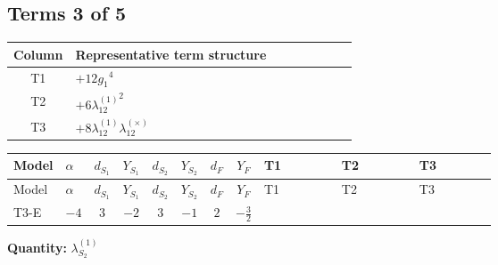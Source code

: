 \documentclass[8pt]{article}
\begin{document}
\begin{landscape}
\subsection*{Terms 3 of 5}
\begin{center}
\begin{tabular}{@{}c >{\raggedright\arraybackslash}p{0.82\linewidth}@{}}
\toprule
Column & Representative term structure \\
\midrule
T1 & \(\displaystyle +12 {g_1}^4\) \\
\midrule
T2 & \(\displaystyle +6 {\lambda_{12}^{(1)}}^2\) \\
\midrule
T3 & \(\displaystyle +8 {\lambda_{12}^{(1)}} {\lambda_{12}^{(\times)}}\) \\
\midrule
\bottomrule
\end{tabular}
\end{center}
\smallskip
\tiny
\begin{longtable}{@{}llcccccc >{\raggedright\arraybackslash}p{0.21\linewidth} >{\raggedright\arraybackslash}p{0.21\linewidth} >{\raggedright\arraybackslash}p{0.21\linewidth}@{}}
\toprule
Model & $\alpha$ & $d_{S_1}$ & $Y_{S_1}$ & $d_{S_2}$ & $Y_{S_2}$ & $d_F$ & $Y_F$ & T1 & T2 & T3 \\
\midrule
\endfirsthead
\toprule
Model & $\alpha$ & $d_{S_1}$ & $Y_{S_1}$ & $d_{S_2}$ & $Y_{S_2}$ & $d_F$ & $Y_F$ & T1 & T2 & T3 \\
\midrule
\endhead
T3-E & $-4$ & $3$ & $-2$ & $3$ & $-1$ & $2$ & $-\frac{3}{2}$ & \scriptsize\adjustbox{max width=\linewidth}{$\begin{gathered} +12 {g_1}^4\end{gathered}$} & \scriptsize\adjustbox{max width=\linewidth}{$\begin{gathered} +6 {\lambda_{12}^{(1)}}^2\end{gathered}$} & \scriptsize\adjustbox{max width=\linewidth}{$\begin{gathered} +8 {\lambda_{12}^{(1)}} {\lambda_{12}^{(\times)}}\end{gathered}$} \\
\midrule
\bottomrule
\end{longtable}
\clearpage
\noindent\textbf{Quantity: }$\lambda_{S_2}^{(1)}$\par\smallskip

\end{landscape}
\end{document}
